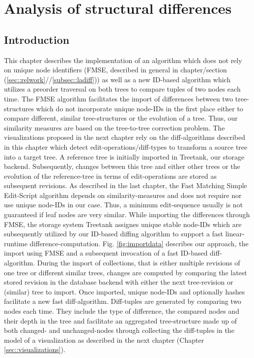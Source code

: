 \section{Analysis of structural differences}\label{sec::differences}
\subsection{Introduction}
This chapter describes the implementation of an algorithm which does not rely on unique node identifiers (FMSE, described in general in chapter/section (\ref{sec::relwork}//\ref{subsec::ladiff})) as well as a new ID-based algorithm which utilizes a preorder traversal on both trees to compare tuples of two nodes each time. The FMSE algorithm facilitates the import of differences between two tree-structures which do not incorporate unique node-IDs in the first place either to compare different, similar tree-structures or the evolution of a tree. Thus, our similarity measures are based on the tree-to-tree correction problem. The visualizations proposed in the next chapter rely on the diff-algorithms described in this chapter which detect edit-operations/diff-types to transform a source tree into a target tree. A reference tree is initially imported in Treetank, our storage backend. Subsequently, changes between this tree and either other trees or the evolution of the reference-tree in terms of edit-operations are stored as subsequent revisions. As described in the last chapter, the Fast Matching Simple Edit-Script algorithm depends on similarity-measures and does not require nor use unique node-IDs in our case. Thus, a minimum edit-sequence usually is not guaranteed if leaf nodes are very similar. While importing the differences through FMSE, the storage system Treetank assignes unique stable node-IDs which are subsequently utilized by our ID-based diffing algorithm to support a fast linear-runtime difference-computation. Fig. \ref{fig:importdata} describes our approach, the import using FMSE and a subsequent invocation of a fast ID-based diff-algorithm. During the import of collections, that is either multiple revisions of one tree or different similar trees, changes are computed by comparing the latest stored revision in the database backend with either the next tree-revision or (similar) tree to import. Once imported, unique node-IDs and optionally hashes facilitate a new fast diff-algorithm. Diff-tuples are generated by comparing two nodes each time. They include the type of difference, the compared nodes and their depth in the tree and facilitate an aggregated tree-structure made up of both changed- and unchanged-nodes through collecting the diff-tuples in the model of a visualization as described in the next chapter (Chapter \ref{sec::visualizations}). 

